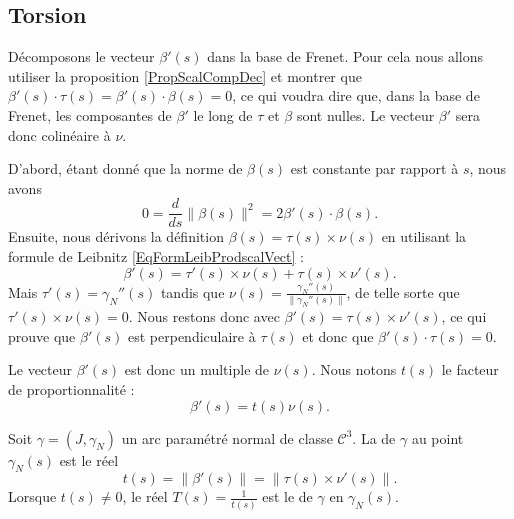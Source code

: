 \subsection{Torsion}

Décomposons le vecteur $\beta'(s)$ dans la base de Frenet. Pour cela nous allons utiliser la proposition \ref{PropScalCompDec} et montrer que $\beta'(s)\cdot \tau(s)=\beta'(s)\cdot\beta(s)=0$, ce qui voudra dire que, dans la base de Frenet, les composantes de $\beta'$ le long de $\tau$ et $\beta$ sont nulles. Le vecteur $\beta'$ sera donc colinéaire à $\nu$.

D'abord, étant donné que la norme de $\beta(s)$ est constante par rapport à $s$, nous avons
\begin{equation}
    0=\frac{ d }{ ds }\| \beta(s) \|^2=2\beta'(s)\cdot\beta(s).
\end{equation}
Ensuite, nous dérivons la définition $\beta(s)=\tau(s)\times\nu(s)$ en utilisant la formule de Leibnitz \eqref{EqFormLeibProdscalVect} :
\begin{equation}
    \beta'(s)=\tau'(s)\times\nu(s)+\tau(s)\times\nu'(s).
\end{equation}
Mais $\tau'(s)=\gamma_N''(s)$ tandis que $\nu(s)=\frac{ \gamma_N''(s) }{ \| \gamma_N''(s) \| }$, de telle sorte que $\tau'(s)\times\nu(s)=0$. Nous restons donc avec $\beta'(s)=\tau(s)\times\nu'(s)$, ce qui prouve que $\beta'(s)$ est perpendiculaire à $\tau(s)$ et donc que $\beta'(s)\cdot\tau(s)=0$.

Le vecteur $\beta'(s)$ est donc un multiple de $\nu(s)$. Nous notons $t(s)$ le facteur de proportionnalité : 
\begin{equation}
    \beta'(s)=t(s)\nu(s).
\end{equation}

\begin{definition}      \label{DefTorsion}
    Soit $\gamma=(J,\gamma_N)$ un arc paramétré normal de classe $\mathcal{C}^3$. La  de $\gamma$ au point $\gamma_N(s)$ est le réel
    \begin{equation}
        t(s)=\| \beta'(s) \|=\| \tau(s)\times\nu'(s) \|.
    \end{equation}
    Lorsque $t(s)\neq 0$, le réel $T(s)=\frac{1}{ t(s) }$ est le  de $\gamma$ en $\gamma_N(s)$.
\end{definition}


